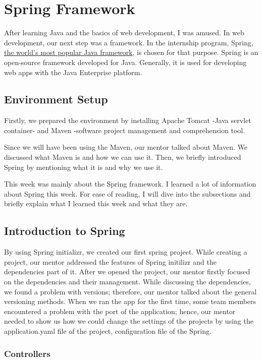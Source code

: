 \section{Spring Framework}

After learning Java and the basics of web development, I was amused. In web development, our next step was a framework. In the internship program, Spring, \href{https://spring.io/why-spring}{the world's most popular Java framework}, is chosen for that purpose. Spring is an open-source framework developed for Java. Generally, it is used for developing web apps with the Java Enterprise platform.

\subsection{Environment Setup}

Firstly, we prepared the environment by installing Apache Tomcat -Java servlet container- and Maven -software project management and comprehension tool. 

Since we will have been using the Maven, our mentor talked about Maven. We discussed what Maven is and how we can use it. Then, we briefly introduced Spring by mentioning what it is and why we use it.

This week was mainly about the Spring framework. I learned a lot of information about Spring this week. For ease of reading, I will dive into the subsections and briefly explain what I learned this week and what they are.

\subsection{Introduction to Spring}

By using Spring initializr, we created our first spring project. While creating a project, our mentor addressed the features of Spring initilizr and the dependencies part of it. After we opened the project, our mentor firstly focused on the dependencies and their management. While discussing the dependencies, we found a problem with versions; therefore, our mentor talked about the general versioning methods. When we ran the app for the first time, some team members encountered a problem with the port of the application; hence, our mentor needed to show us how we could change the settings of the projects by using the application.yaml file of the project, configuration file of the Spring.

\subsubsection{Controllers}

